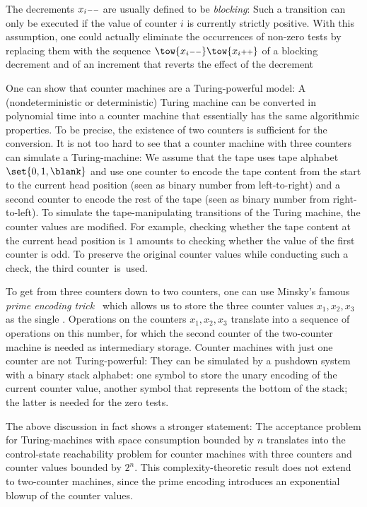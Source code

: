\documentclass[../../diss.tex]{subfiles}
\begin{document}
The decrements $x_i{\scriptstyle--}$ are usually defined to be \emph{blocking}: Such a transition can only be executed if the value of counter $i$ is currently strictly positive.
With this assumption, one could actually eliminate the occurrences of non-zero tests by replacing them with the sequence $\tow{\decop{x_i}} \tow{\incop{x_i}}$ of a blocking decrement and of an increment that reverts the effect of the decrement

One can show that counter machines are a Turing-powerful model:
A (nondeterministic or deterministic) Turing machine can be converted in polynomial time into a counter machine that essentially has the same algorithmic properties.
To be precise, the existence of two counters is sufficient for the conversion.
It is not too hard to see that a counter machine with three counters can simulate a Turing-machine: We assume that the tape uses tape alphabet $\set{0,1,\blank}$ and use one counter to encode the tape content from the start to the current head position (seen as binary number from left-to-right) and a second counter to encode the rest of the tape (seen as binary number from right-to-left).
To simulate the tape-manipulating transitions of the Turing machine, the counter values are modified.
For example, checking whether the tape content at the current head position is $1$ amounts to checking whether the value of the first counter is odd.
To preserve the original counter values while conducting such a check, the third counter~is~used.

To get from three counters down to two counters, one can use Minsky's famous \emph{prime encoding trick}~\cite{Minsky67} which allows us to store the three counter values $x_1, x_2, x_3$ as the single .
Operations on the counters $x_1, x_2, x_3$ translate into a sequence of operations on this number, for which the second counter of the two-counter machine is needed as intermediary storage.
Counter machines with just one counter are not Turing-powerful:
They can be simulated by a pushdown system with a binary stack alphabet: one symbol to store the unary encoding of the current counter value, another symbol that represents the bottom of the stack; the latter is needed for the zero tests.

The above discussion in fact shows a stronger statement:
The acceptance problem for Turing-machines with space consumption bounded by $n$ translates into the control-state reachability problem for counter machines with three counters and counter values bounded by $2^n$.
This complexity-theoretic result does not extend to two-counter machines, since the prime encoding introduces an exponential blowup of the counter values.
\end{document}
